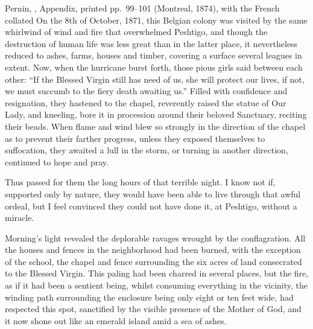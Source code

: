 \begin{witnesstext}{Pernin, ,
Appendix, printed pp.~99--101 (Montreal, 1874), with the French
collated}
On the 8th of October, 1871, this Belgian colony was visited by the
same whirlwind of wind and fire that overwhelmed Peshtigo, and though
the destruction of human life was less great than in the latter place,
it nevertheless reduced to ashes, farms, houses and timber, covering a
surface several leagues in extent. Now, when the hurricane burst forth,
those pious girls said between each other: ``If the Blessed Virgin
still has need of us, she will protect our lives, if not, we must
succumb to the fiery death awaiting us.'' Filled with confidence and
resignation, they hastened to the chapel, reverently raised the statue
of Our Lady, and kneeling, bore it in procession around their beloved
Sanctuary, reciting their beads. When flame and wind blew so strongly
in the direction of the chapel as to prevent their farther progress,
unless they exposed themselves to suffocation, they awaited a lull in
the storm, or turning in another direction, continued to hope and
pray.\par
Thus passed for them the long hours of that terrible night. I know not
if, supported only by nature, they would have been able to live through
that awful ordeal, but I feel convinced they could not have done it, at
Peshtigo, without a miracle.\par
Morning's light revealed the deplorable ravages wrought by the
conflagration. All the houses and fences in the neighborhood had been
burned, with the exception of the school, the chapel and fence
surrounding the six acres of land consecrated to the Blessed Virgin.
This paling had been charred in several places, but the fire, as if it
had been a sentient being, whilst consuming everything in the vicinity,
the winding path surrounding the enclosure being only eight or ten feet
wide, had respected this spot, sanctified by the visible presence of
the Mother of God, and it now shone out like an emerald island amid a
sea of ashes.
\end{witnesstext}

